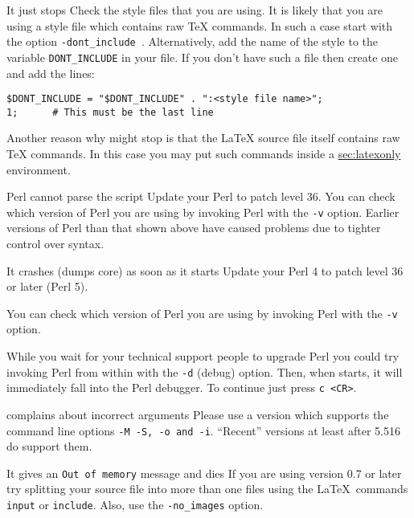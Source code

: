 \begin{htmllist}
\item [It just stops] Check the style
files that you are using. It is likely that you are using
a style file which contains raw TeX commands. In such a case
start \latextohtml{} with the option \texttt{-dont\_include }. Alternatively, add the name of the style to the variable 
\texttt{DONT\_INCLUDE} in your
 file. If you don't have such a file then
create one and add the lines:
\begin{verbatim}
$DONT_INCLUDE = "$DONT_INCLUDE" . ":<style file name>";
1;      # This must be the last line
\end{verbatim}

Another reason why \latextohtml{} might stop is that the LaTeX source
file itself contains raw TeX commands. In this case you may 
put such commands inside a 
\hyperref{\texttt{latexonly}}{\texttt{latexonly (see Section }}{)}{sec:latexonly}
environment.

\item [Perl cannot parse the \fn{latex2html} script]
Update your Perl to patch level 36. You can check which version of
Perl you are using by invoking Perl with the \texttt{-v} option.
Earlier versions of Perl than that shown above
have caused problems due
to tighter control over syntax.

\item [It crashes (dumps core) as soon as it starts \label{perl}]
Update your Perl 4 to patch level 36 or later (Perl 5).

You can check which version of
Perl you are using by invoking Perl with the \texttt{-v} option.


While you wait for your technical support people to upgrade Perl
you could try invoking Perl from within \latextohtml{} with 
the \texttt{-d} (debug) option. Then, when \latextohtml{} starts, it will
immediately fall into the Perl debugger. To continue just press 
\texttt{c <CR>}.

\item [\fn{dvips} complains about incorrect arguments \label{dvips}]
Please use a version which supports the command line options \texttt{-M -S,
-o and -i}. ``Recent'' versions at least after 5.516 do
support them.

\item [It gives an \texttt{Out of memory} message and dies] 
If you are using version \latextohtml{} 0.7 or later try splitting your 
source file into more than one files using the \LaTeX\ 
commands \texttt{input} or \texttt{include}. 
Also, use the \texttt{-no\_images} option.


\end{htmllist}
